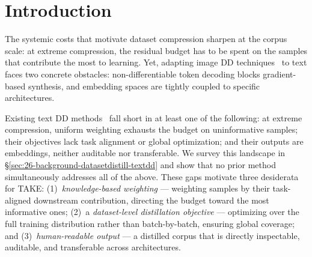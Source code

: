 \section{Introduction} \label{sec:51-research03-introduction}

\begin{foldable} %
  The systemic costs that motivate dataset compression sharpen at the corpus scale: at extreme compression, the residual budget has to be spent on the samples that contribute the most to learning.
  Yet, adapting image \ac{DD} techniques~\cite{wang2018dataset,zhao2021dataset,zhao2023dataset} to text faces two concrete obstacles: non-differentiable token decoding blocks gradient-based synthesis, and embedding spaces are tightly coupled to specific architectures.
\end{foldable}

\begin{foldable} %
  Existing text \ac{DD} methods~\cite{sucholutsky2021soft,li2021data,maekawa2023dataset,maekawa2024dilm,tao2024textual} fall short in at least one of the following: at extreme compression, uniform weighting exhausts the budget on uninformative samples; their objectives lack task alignment or global optimization; and their outputs are embeddings, neither auditable nor transferable.
  We survey this landscape in \S\ref{sec:26-background-datasetdistill-textdd} and show that no prior method simultaneously addresses all of the above.
  These gaps motivate three desiderata for TAKE:{
    (1)~\textit{knowledge-based weighting} --- weighting samples by their task-aligned downstream contribution, directing the budget toward the most informative ones;
    (2)~a \textit{dataset-level distillation objective} --- optimizing over the full training distribution rather than batch-by-batch, ensuring global coverage;
    and (3)~\textit{human-readable output} --- a distilled corpus that is directly inspectable, auditable, and transferable across architectures.
  }
\end{foldable}

